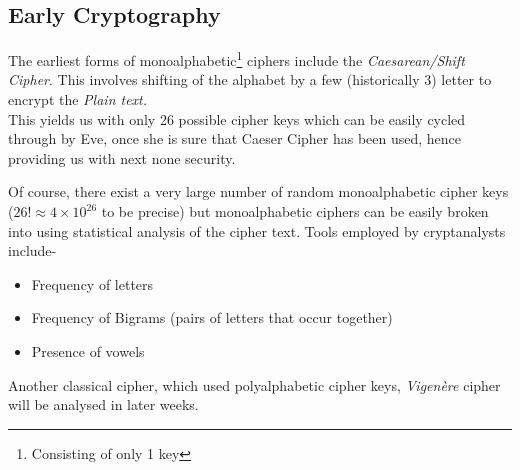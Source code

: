 	 	\subsection{Early Cryptography}
	 		The earliest forms of monoalphabetic\footnote{Consisting of only 1 key} ciphers include the \emph{Caesarean/Shift Cipher}. This involves shifting of the alphabet by a few (historically 3) letter to encrypt the \emph{Plain text.} \\
	 		This yields us with only 26 possible cipher keys which can be easily cycled through by Eve, once she is sure that Caeser Cipher has been used, hence providing us with next none security. \par
	 		Of course, there exist a very large number of random monoalphabetic cipher keys (\(26! \approx 4\times10^{26}\) to be precise) but monoalphabetic ciphers can be easily broken into using statistical analysis of the cipher text. Tools employed by cryptanalysts include- 
	 		\begin{itemize}
	 			\item Frequency of letters
	 			\item Frequency of Bigrams (pairs of letters that occur together)
	 			\item Presence of vowels 
	 		\end{itemize}
	 		\begin{mybox}Another classical cipher, which used polyalphabetic cipher keys, \emph{Vigen\`{e}re} cipher will be analysed in later weeks.\end{mybox}
	 
